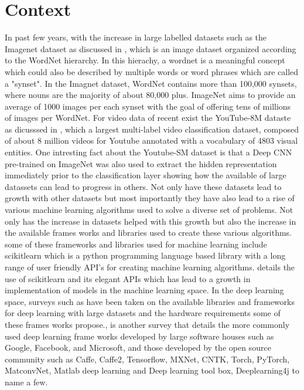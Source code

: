 


\section{Context}
    In past few years, with the increase in large labelled datasets such as the Imagenet dataset as discussed in \citep{JiaDeng2009IAlh}, which is an image dataset organized according to the WordNet hierarchy. In this hierachy, a wordnet is a meaningful concept which could also be described by multiple words or word phrases which are called a "synset". In the Imagnet dataset, WordNet contains more than 100,000 synsets, where nouns are the majority of about 80,000 plus. ImageNet aims to provide an average of 1000 images per each synset with the goal of offering tens of millions of images per WordNet. For video data of recent exist the YouTube-8M dataste as dicusssed in \citep{45619}, which a largest multi-label video classification dataset, composed of about 8 million videos for Youtube annotated with a vocabulary of 4803 visual entities. One intresting fact about the Youtube-SM dataset is that a Deep CNN pre-trained on ImageNet was also used to extract the hidden representation immediately prior to the classification layer showing how the available of large datassets can lead to progress in others. Not only have these datasets lead to growth with other datasets but most importantly they have also lead to a rise of various machine learning algorithms used to solve a diverse set of problems. Not only has the increase in datasets helped with this growth but also the increase in the available frames works and libraries used to create these various algorithms. some of these frameworks and libraries used for machine learning include scikitlearn which is a python programming language based library with a long range of user friendly API's for creating machine learning algorithms. \citep{DBLPjournalscorrBuitinckLBPMGNPGGLVJHV13} details the use of scikitlearn and its elegant APIs which has lead to a growth in implementation of models in the machine learning space. In the deep learning space, surveys such as \citep{Nguyen2019} have been taken on the available libraries and frameworks for deep learning with large datasets and the hardware requirements some of these frames works propose.\citep{Wang2019}, is another survey that details the more commonly used deep learning frame works developed by large software houses such as Google, Facebook, and Microsoft, and those developed by the open source community such as Caffe, Caffe2, Tensorflow, MXNet, CNTK, Torch, PyTorch,  MatconvNet, Matlab deep learning and Deep learning tool box, Deeplearning4j to name a few.
